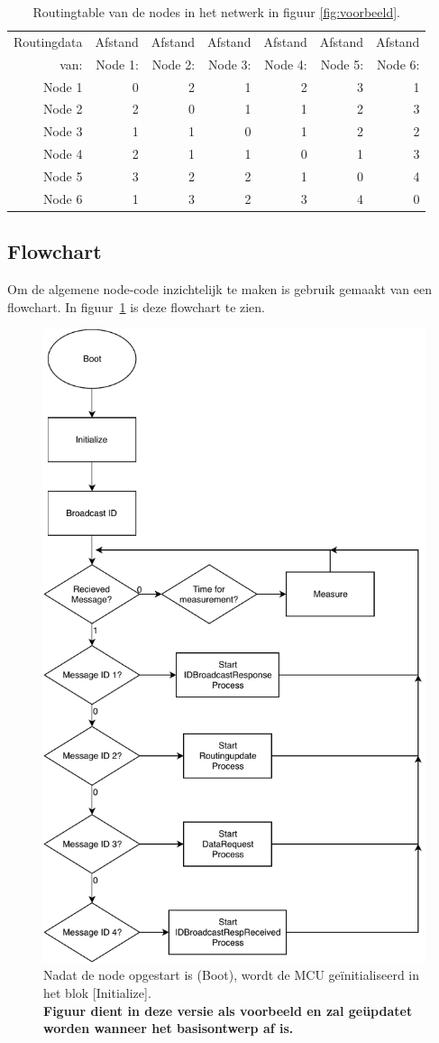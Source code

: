 \documentclass[a4paper, 11pt]{article}
\begin{document}
\begin{table}
\centering
\begin{tabular}{|r||r|r|r|r|r|r|}
\hline
Routingdata  & Afstand  & Afstand & Afstand & Afstand & Afstand & Afstand\\
van: & Node 1: & Node 2: & Node 3: & Node 4: & Node 5: & Node 6: \\
\hline
Node 1 & 0 & 2 & 1 & 2 & 3 & 1 \\
\hline
Node 2 & 2 & 0 & 1 & 1 & 2 & 3 \\
\hline
Node 3 & 1 & 1 & 0 & 1 & 2 & 2 \\
\hline
Node 4 & 2 & 1 & 1 & 0 & 1 & 3 \\
\hline
Node 5 & 3 & 2 & 2 & 1 & 0 & 4 \\
\hline
Node 6 & 1 & 3 & 2 & 3 & 4 & 0 \\
\hline
\end{tabular}
\caption{Routingtable van de nodes in het netwerk in figuur \ref{fig:voorbeeld}.}
\label{table:routingtable}
\end{table}
\subsection{Flowchart}
Om de algemene node-code inzichtelijk te maken is gebruik gemaakt van een flowchart. In figuur~\ref{fig:flowchart} is deze flowchart te zien.

\begin{figure}[!h]
	\centering	
	\includegraphics[width=.5\textwidth, keepaspectratio]{media/Pflow.pdf}
    \caption{Nadat de node opgestart is (Boot), wordt de MCU geïnitialiseerd in het blok [Initialize].\\
     \textbf{Figuur dient in deze versie als voorbeeld en zal geüpdatet worden wanneer het basisontwerp af is.}}
    \label{fig:flowchart}
\end{figure}
\end{document}
